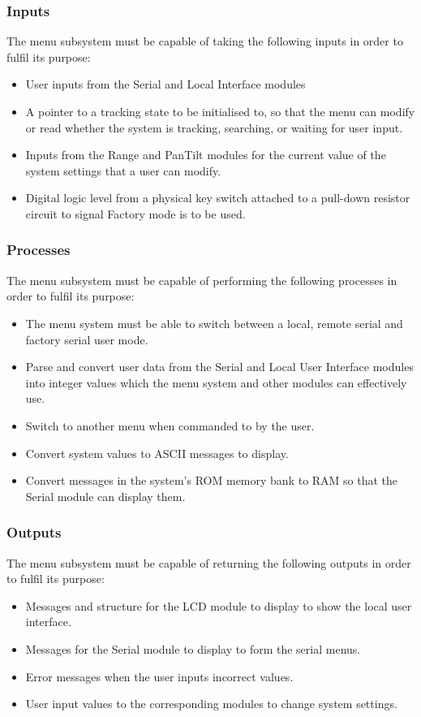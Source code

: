 \documentclass[]{report}
\begin{document}
\subsubsection{Inputs}
The menu subsystem must be capable of taking the following inputs in order to fulfil its purpose:
\begin{itemize}
	\item User inputs from the Serial and Local Interface modules
	\item A pointer to a tracking state to be initialised to, so that the menu can modify or read whether the system is tracking, searching, or waiting for user input.
	\item Inputs from the Range and PanTilt modules for the current value of the system settings that a user can modify. 
	\item Digital logic level from a physical key switch attached to a pull-down resistor circuit to signal Factory mode is to be used. 
\end{itemize}

\subsubsection{Processes}
The menu subsystem must be capable of performing the following processes in order to fulfil its purpose:
\begin{itemize}
	\item The menu system must be able to switch between a local, remote serial and factory serial user mode. 
	\item Parse and convert user data from the Serial and Local User Interface modules into integer values which the menu system and other modules can effectively use. 
	\item Switch to another menu when commanded to by the user.
	\item Convert system values to ASCII messages to display.
	\item Convert messages in the system's ROM memory bank to RAM so that the Serial module can display them. 
\end{itemize}

\subsubsection{Outputs}
The menu subsystem must be capable of returning the following outputs in order to fulfil its purpose:
\begin{itemize}
	\item Messages and structure for the LCD module to display to show the local user interface.
	\item Messages for the Serial module to display to form the serial menus.
	\item Error messages when the user inputs incorrect values.
	\item User input values to the corresponding modules to change system settings. 
\end{itemize}
\end{document}

